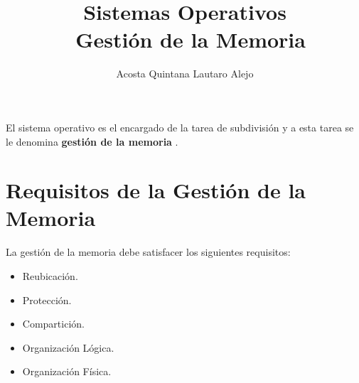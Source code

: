 \documentclass[12pt,a4paper]{article}
\title{Sistemas Operativos \\\ Gestión de la Memoria}
\author{Acosta Quintana Lautaro Alejo}
\begin{document}
\maketitle
\tableofcontents
\break

El sistema operativo es el encargado de la tarea de subdivisión y a esta tarea se le denomina \textbf{gestión de la memoria} .
\section{Requisitos de la Gestión de la Memoria}
La gestión de la memoria debe satisfacer los siguientes requisitos:
\begin{itemize}
    \item Reubicación.
    \item Protección.
    \item Compartición.
    \item Organización Lógica.
    \item Organización Física.
\end{itemize}
\end{document}
